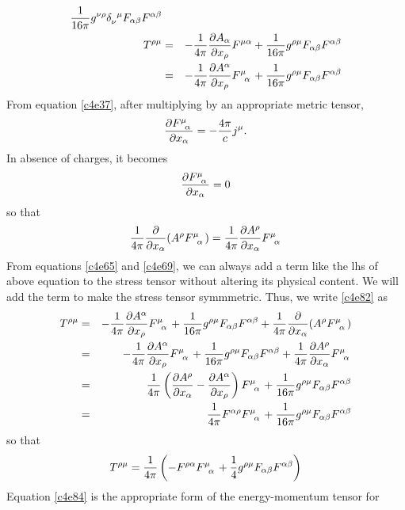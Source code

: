 \begin{enumerate}
\begin{eqnarray}
\frac{1}{16\pi}g^{\nu\rho}\tensor{\delta}{_\nu^\mu} F_{\alpha\beta}F^{\alpha\beta} \nonumber \\
T^{\rho\mu} &=& -\frac{1}{4\pi}\pdt{A_\alpha}{x_\rho}F^{\mu\alpha} + 
\frac{1}{16\pi}\tensor{g}{^\rho^\mu} F_{\alpha\beta}F^{\alpha\beta} \nonumber \\
 &=& -\frac{1}{4\pi}\pdt{A^\alpha}{x_\rho}\tensor{F}{^\mu_\alpha} + 
\frac{1}{16\pi}\tensor{g}{^\rho^\mu} F_{\alpha\beta}F^{\alpha\beta} \label{c4e82}
\end{eqnarray}
From equation \eqref{c4e37}, after multiplying by an appropriate metric tensor,
\[
\pdt{\tensor{F}{^\mu_\alpha}}{x_\alpha} = -\frac{4\pi}{c}j^\mu.
\]
In absence of charges, it becomes
\[
\pdt{\tensor{F}{^\mu_\alpha}}{x_\alpha} = 0
\]
so that
\begin{equation}\label{c4e83}
\frac{1}{4\pi}\frac{\partial}{\partial x_\alpha}(A^\rho\tensor{F}{^\mu_\alpha}) = 
\frac{1}{4\pi}\pdt{A^\rho}{x_\alpha}\tensor{F}{^\mu_\alpha}
\end{equation}
From equations \eqref{c4e65} and \eqref{c4e69}, we can always add a term like 
the lhs of above equation to the stress tensor without altering its physical 
content. We will add the term to make the stress tensor symmmetric. Thus, we 
write \eqref{c4e82} as
\begin{eqnarray*}
T^{\rho\mu} &=& -\frac{1}{4\pi}\pdt{A^\alpha}{x_\rho}\tensor{F}{^\mu_\alpha} + 
\frac{1}{16\pi}\tensor{g}{^\rho^\mu} F_{\alpha\beta}F^{\alpha\beta} +
\frac{1}{4\pi}\frac{\partial}{\partial x_\alpha}(A^\rho\tensor{F}{^\mu_\alpha}) \\
 &=& -\frac{1}{4\pi}\pdt{A^\alpha}{x_\rho}\tensor{F}{^\mu_\alpha} + 
\frac{1}{16\pi}\tensor{g}{^\rho^\mu} F_{\alpha\beta}F^{\alpha\beta} +
\frac{1}{4\pi}\pdt{A^\rho}{x_\alpha}\tensor{F}{^\mu_\alpha} \\
 &=& \frac{1}{4\pi}\left(\pdt{A^\rho}{x_\alpha} - \pdt{A^\alpha}{x_\rho}\right)
 \tensor{F}{^\mu_\alpha} + 
 \frac{1}{16\pi}\tensor{g}{^\rho^\mu} F_{\alpha\beta}F^{\alpha\beta} \\
 &=& \frac{1}{4\pi}F^{\alpha\rho}\tensor{F}{^\mu_\alpha} +
  \frac{1}{16\pi}\tensor{g}{^\rho^\mu} F_{\alpha\beta}F^{\alpha\beta}
\end{eqnarray*}
so that
\begin{equation}\label{c4e84}
T^{\rho\mu} = \frac{1}{4\pi}\left(-F^{\rho\alpha}\tensor{F}{^\mu_\alpha} +
\frac{1}{4}g^{\rho\mu}F_{\alpha\beta}F^{\alpha\beta}\right)
\end{equation}
Equation \eqref{c4e84} is the appropriate form of the energy-momentum tensor for

\end{enumerate}

